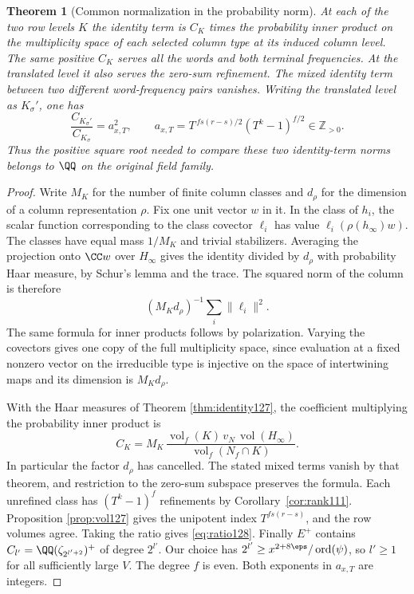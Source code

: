 \documentclass[a4paper,11pt]{article}
\newtheorem{theorem}[proposition]{Theorem}
\theoremstyle{definition}
\theoremstyle{remark}
\newcommand{\ZZ}{\mathbb Z}\newcommand{\ord}{\operatorname{ord}}
\numberwithin{equation}{section}
\begin{document}
\begin{theorem}[Common normalization in the probability norm]
\label{thm:commonnorm128}
At each of the two row levels \(K\) the identity term is
\(C_K\) times the probability inner product on the multiplicity
space of each selected column type at its induced column level.
The same positive \(C_K\) serves all the words and both terminal
frequencies. At the translated level it also serves the zero-sum
refinement. The mixed identity term between two different
word-frequency pairs vanishes. Writing the translated level
as \(K_\sigma'\), one has
\begin{equation}
 \frac{C_{K_\sigma'}}{C_{K_\sigma}}=a_{x,T}^2,\qquad
 a_{x,T}=T^{\,fs(r-s)/2}(T^k-1)^{f/2}\in\ZZ_{>0}.
 \label{eq:ratio128}
\end{equation}
Thus the positive square root needed to compare these two
identity-term norms belongs to \(\QQ\) on the original field family.
\end{theorem}
\begin{proof}
Write \(M_K\) for the number of finite column classes and
\(d_\rho\) for the dimension of a column representation \(\rho\).
Fix one unit vector \(w\) in it. In the class of \(h_i\), the scalar
function corresponding to the class covector \(\ell_i\) has
value \(\ell_i(\rho(h_\infty)w)\). The classes have equal mass
\(1/M_K\) and trivial stabilizers. Averaging the projection onto
\(\CC w\) over \(H_\infty\) gives the identity divided by \(d_\rho\)
with probability Haar measure, by Schur's lemma and the trace.
The squared norm of the column is therefore
\[
        (M_K d_\rho)^{-1}\sum_i\|\ell_i\|^2 .
\]
The same formula for inner products follows by polarization.
Varying the covectors gives one copy of the full multiplicity
space, since evaluation at a fixed nonzero vector on the irreducible
type is injective on the space of intertwining maps and its
dimension is \(M_K d_\rho\).

With the Haar measures of Theorem \ref{thm:identity127}, the
coefficient multiplying the probability inner product is
\[
       C_K=M_K\,\frac{\operatorname{vol}_f(K)\,v_N\,
                  \operatorname{vol}(H_\infty)}
                 {\operatorname{vol}_f(N_f\cap K)} .
\]
In particular the factor \(d_\rho\) has cancelled. The stated
mixed terms vanish by that theorem, and restriction to the
zero-sum subspace preserves the formula. Each unrefined class
has \((T^k-1)^f\) refinements by Corollary~\ref{cor:rank111}.
Proposition \ref{prop:vol127} gives the unipotent index
\(T^{fs(r-s)}\), and the row volumes agree. Taking the ratio
gives \eqref{eq:ratio128}. Finally \(E^+\) contains
\(C_{l'}=\QQ(\zeta_{2^{l'+2}})^+\) of degree \(2^{l'}\).
Our choice has \(2^{l'}\ge x^{2+8\eps}/\operatorname{ord}(\psi)\),
so \(l'\ge1\) for all sufficiently large \(V\).
The degree \(f\) is even. Both exponents in \(a_{x,T}\) are
integers.
\end{proof}
\end{document}

